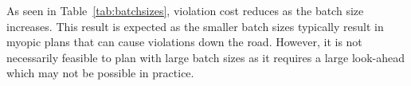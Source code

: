 As seen in Table~\ref{tab:batchsizes}, violation cost reduces as the batch size increases. This result is expected as the smaller batch sizes typically result in myopic plans that can cause violations down the road. However, it is not necessarily feasible to plan with large batch sizes as it requires a large look-ahead which may not be possible in practice. 

